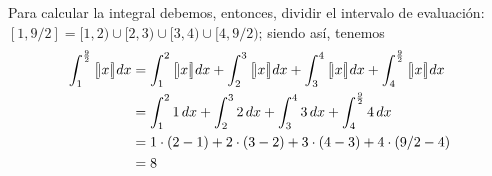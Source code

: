 Para calcular la integral debemos, entonces, dividir el intervalo de evaluación: {\small $[1,9/2]=[1,2)\cup [2,3)\cup [3,4)\cup [4,9/2) $}; siendo así, tenemos
\begin{align*}
\int_{1}^{\frac{9}{2}}\big[\hspace{-0.05cm}| x|\hspace{-0.07cm}\big]
dx&=\int_{1}^{2}\big[\hspace{-0.05cm}| x|\hspace{-0.07cm}\big] dx+\int_{2}^{3}\big[\hspace{-0.05cm}| x|\hspace{-0.07cm}\big] dx+\int_{3}^{4}\big[\hspace{-0.05cm}| x|\hspace{-0.07cm}\big] dx+\int_{4}^{%
\frac{9}{2}}\big[\hspace{-0.05cm}| x|\hspace{-0.07cm}\big] dx\\
&=\int_{1}^{2}1\, dx+\int_{2}^{3}2\, dx+\int_{3}^{4}3\, dx+\int_{4}^{\frac{9}{2}}4\, dx\\
&=1\cdot(2-1)+2\cdot(3-2)+3\cdot(4-3)+4\cdot(9/2-4)\\
&=8
\end{align*}


